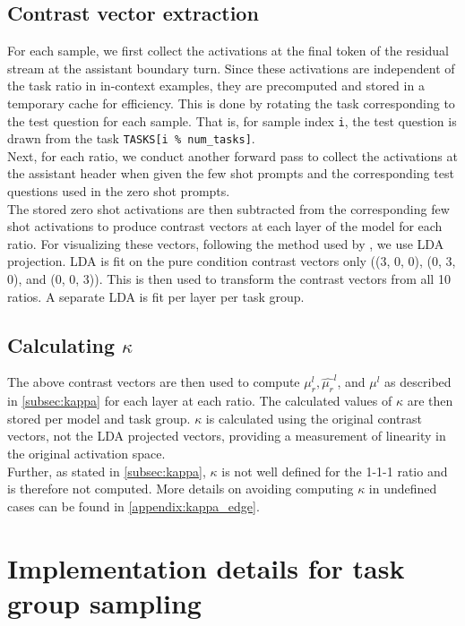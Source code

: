 \documentclass[11pt]{article}
\begin{document}
\subsection*{Contrast vector extraction}
For each sample, we first collect the activations at the final token of the residual stream at the assistant boundary turn. Since these activations are independent of the task ratio in in-context examples, they are precomputed and stored in a temporary cache for efficiency. This is done by rotating the task corresponding to the test question for each sample. That is, for sample index \texttt{i}, the test question is drawn from the task \texttt{TASKS[i \% num\_tasks]}. \\[1em]
Next, for each ratio, we conduct another forward pass to collect the activations at the assistant header when given the few shot prompts and the corresponding test questions used in the zero shot prompts. \\[1em]
The stored zero shot activations are then subtracted from the corresponding few shot activations to produce contrast vectors at each layer of the model for each ratio. For visualizing these vectors, following the method used by \citet{xiong2024everything}, we use LDA projection. LDA is fit on the pure condition contrast vectors only ((3, 0, 0), (0, 3, 0), and (0, 0, 3)). This is then used to transform the contrast vectors from all 10 ratios. A separate LDA is fit per layer per task group.

\subsection*{Calculating $\kappa$}
The above contrast vectors are then used to compute \(\mu_r^l, \hat{\mu_r}^l\), and \(\mu^l\) as described in \ref{subsec:kappa} for each layer at each ratio. The calculated values of \(\kappa\) are then stored per model and task group. \(\kappa\) is calculated using the original contrast vectors, not the LDA projected vectors, providing a measurement of linearity in the original activation space. \\[1em]
Further, as stated in \ref{subsec:kappa}, \(\kappa\) is not well defined for the 1-1-1 ratio and is therefore not computed. More details on avoiding computing \(\kappa\) in undefined cases can be found in \autoref{appendix:kappa_edge}.

\section{Implementation details for task group sampling}
\label{appendix:sampling}
\end{document}
